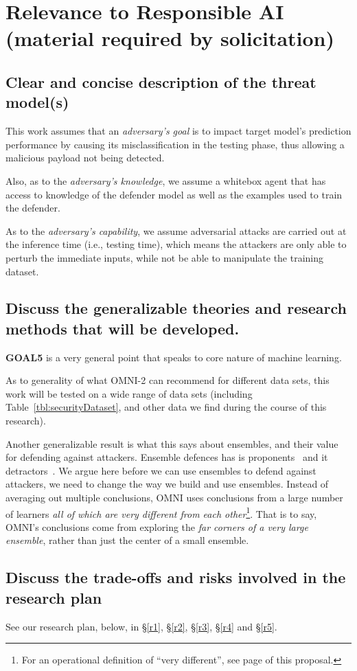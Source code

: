 
\section{
Relevance to Responsible AI (material required by solicitation)} 
\subsection{Clear and concise description of the threat model(s)}
\bi
\item
This work assumes that an {\em adversary's goal} is to impact target model’s prediction performance by causing its misclassification in the testing phase, thus 
allowing a malicious payload not being detected.
\item
Also, as to the {\em adversary's knowledge},
we assume a whitebox agent that has access to      knowledge of the defender model as well
as the examples used to train the defender. 
\item
As to the 
{\em adversary’s capability},  we assume adversarial attacks are carried out at the inference time (i.e., testing time), which means the attackers are only able to perturb the immediate inputs, while not be able to manipulate the training dataset. 
\ei
\subsection{Discuss the generalizable theories and research methods that will be developed.} {\bf GOAL5} is
a very general point that speaks to core nature of machine learning.

As to generality of what OMNI-2 can recommend for different data sets, this work will be tested
on a wide range of data sets (including Table~\ref{tbl:securityDataset}, and  other data we   find 
during the course of this research).


Another generalizable result is what this says about  
 ensembles, and their value for  defending against attackers. Ensemble defences has is proponents~\cite{kariyappa2019improving,biggio2010multiple,DBLP:conf/iclr/TramerKPGBM18,smutz2016tree,kantchelian2016evasion} and it detractors~\cite{zhang2020decision,zhang2018gradient,he2017adversarial,DBLP:conf/iclr/TramerKPGBM18,DBLP:journals/corr/PapernotMG16}. 
 We argue here before we can use ensembles to defend against attackers, we need to change the way we build and use ensembles.  
Instead of averaging out multiple conclusions, OMNI  uses conclusions
from a large number of learners {\em all of which are  very
different from each other}\footnote{For an operational definition of ``very different'', see page \pageref{definititions}
of this proposal.}.
That is to say, 
 OMNI's conclusions come from exploring the 
 {\em far corners of a very large ensemble}, rather than just the center
of a   small ensemble. 

\subsection{Discuss the trade-offs and risks involved in the research plan}
See our research plan, below, in
\S\ref{r1}, \S\ref{r2}, \S\ref{r3}, \S\ref{r4} and \S\ref{r5}.

